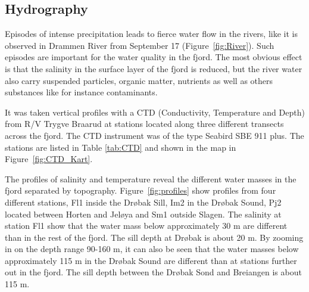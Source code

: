 \documentclass[12pt,a4paper,english]{article}
\begin{document}
\clearpage

\subsection{Hydrography}
\label{sect:hydro}
Episodes of intense precipitation leads to fierce water flow in the rivers, 
like it is observed in Drammen River from September 17 (Figure~\ref{fig:River}).
Such episodes are important for the water quality in the fjord. 
The most obvious effect is that the salinity in the surface layer of the fjord 
is reduced, but the river water also carry suspended particles, organic matter, 
nutrients as well as others substances like for instance contaminants.       

It was taken vertical profiles with a CTD (Conductivity, Temperature and Depth)
from R/V Trygve Braarud 
at stations located along three different transects across the fjord. 
The CTD instrument was of the type Seabird SBE 911 plus.
The stations are listed in Table \ref{tab:CTD} and shown in the map in 
Figure~\ref{fig:CTD_Kart}. 

The profiles of salinity and temperature reveal the different water masses in 
the fjord separated by topography. Figure~\ref{fig:profiles} show profiles from 
four different stations, Fl1 inside the Dr{\o}bak Sill, Im2 in the Dr{\o}bak Sound, 
Pj2 located between Horten and Jel{\o}ya and Sm1 outside Slagen. 
The salinity at station Fl1 show that the water mass below approximately 30 m 
are different than in the rest of the fjord. 
The sill depth at Dr{\o}bak is about 20 m. 
By zooming in on the depth range 90-160 m, it can also be seen that the water 
masses below approximately 115 m in the Dr{\o}bak Sound are different than at 
stations further out in the fjord. The sill depth between the Dr{\o}bak Sond and 
Breiangen is about 115 m. 
\end{document}
